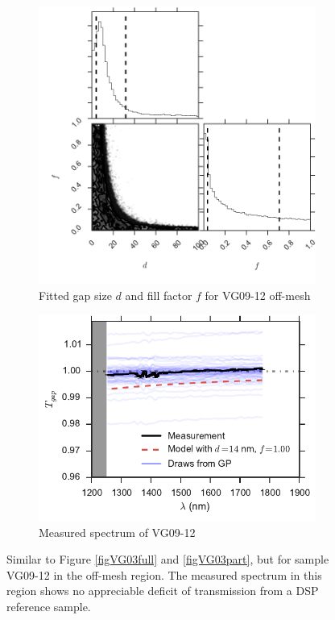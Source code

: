 \begin{figure}[htbp]
    \centering
    \begin{subfigure}[b]{0.5\textwidth}
        \includegraphics[width=\textwidth]{chSiGaps/figs/VG0912_0gap_corner.pdf}
        \caption{Fitted gap size $d$ and fill factor $f$ for VG09-12 off-mesh}
	\label{VG0912_0gap_corner}
    \end{subfigure}
    \begin{subfigure}[b]{0.5\textwidth}
        \includegraphics[width=\textwidth]{chSiGaps/figs/VG0912_0gap.pdf}
        \caption{Measured spectrum of VG09-12}
        \label{VG0912_0gap}
    \end{subfigure}
\caption{Similar to Figure \ref{figVG03full} and \ref{figVG03part}, but for sample VG09-12 in the off-mesh region.  The measured spectrum in this region shows no appreciable deficit of transmission from a DSP reference sample.
\label{figVG12}}
\end{figure}

